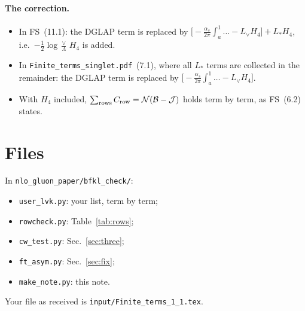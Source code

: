 \documentclass[10pt]{article}
\numberwithin{equation}{section}
\newcommand{\Lv}{L_{\vee}}
\newcommand{\Ls}{L_{*}}
\newcommand{\JJ}{\mathcal J}
\newcommand{\BB}{\mathcal B}
\newcommand{\NN}{\mathcal N}
\begin{document}
\paragraph{The correction.}
\begin{itemize}
\item In FS~(11.1): the DGLAP term is replaced by $\big[-\frac{\alpha_s}{2\pi}\int_a^1\dots-\Lv H_4\big]+\Ls H_4$, i.e.\ $-\frac12\log\frac\vee\Lambda\,H_4$ is added.
\item In \texttt{Finite\_terms\_singlet.pdf}~(7.1), where all $\Ls$ terms are collected in the remainder: the DGLAP term is replaced by $\big[-\frac{\alpha_s}{2\pi}\int_a^1\dots-\Lv H_4\big]$.
\item With $H_4$ included, $\sum_{\rm rows}C_{\rm row}=\NN(\BB-\JJ)$ holds term by term, as FS~(6.2) states.
\end{itemize}

\section{Files}\label{sec:files}
In \texttt{nlo\_gluon\_paper/bfkl\_check/}:
\begin{itemize}
\item \texttt{user\_lvk.py}: your list, term by term;
\item \texttt{rowcheck.py}: Table~\ref{tab:rows};
\item \texttt{cw\_test.py}: Sec.~\ref{sec:three};
\item \texttt{ft\_asym.py}: Sec.~\ref{sec:fix};
\item \texttt{make\_note.py}: this note.
\end{itemize}
Your file as received is \texttt{input/Finite\_terms\_1\_1.tex}.
\end{document}
